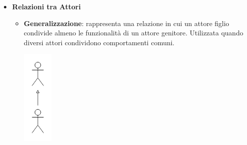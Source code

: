 \begin{itemize}
	\item \textbf{Relazioni tra Attori}
	      \begin{itemize}
		      \item \textbf{Generalizzazione}: rappresenta una relazione in cui un attore figlio condivide almeno le funzionalità di un attore genitore. Utilizzata quando diversi attori condividono comportamenti comuni.
		            \begin{center}
			            \includegraphics*[width=1.5cm]{../../../images/norme_di_progetto/generalizzazione_attori.png}
		            \end{center}
	      \end{itemize}


\end{itemize}
